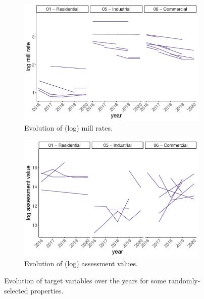 \documentclass{article}
\begin{document}
\begin{figure}[ht]
\centering
\begin{subfigure}{.5\textwidth}
  \centering
  \includegraphics[width=.9\textwidth]{figures/6. mill rate evolution sample.pdf}
  \caption{Evolution of (log) mill rates.}
  \label{fig:evolution_millrate}
\end{subfigure}%
\begin{subfigure}{.5\textwidth}
  \centering
  \includegraphics[width=.9\textwidth]{figures/6.1 assessment evolution sample.pdf}
  \caption{Evolution of (log) assessment values.}
  \label{fig:evolution_assessment}
\end{subfigure}
\caption{Evolution of target variables over the years for some randomly-selected properties.}
\label{fig:evolution}
\end{figure}



\end{document}
